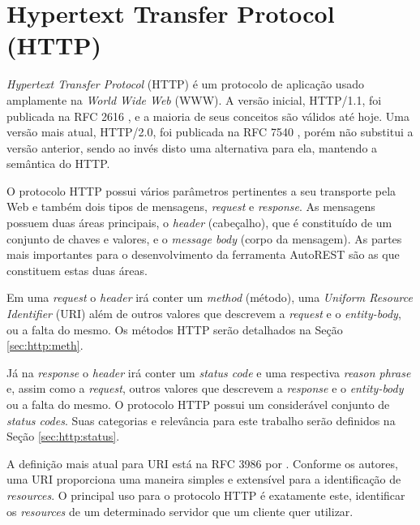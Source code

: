
\section{Hypertext Transfer Protocol (HTTP)}

\textit{Hypertext Transfer Protocol} (HTTP) é um protocolo de aplicação \cite{RFC1123} usado amplamente na \textit{World Wide Web} (WWW). A versão inicial, HTTP/1.1, foi publicada na RFC 2616 \cite{RFC2616}, e a maioria de seus conceitos são válidos até hoje. Uma versão mais atual, HTTP/2.0, foi publicada na RFC 7540 \cite{RFC7540}, porém não substitui a versão anterior, sendo ao invés disto uma alternativa para ela, mantendo a semântica do HTTP.

O protocolo HTTP possui vários parâmetros pertinentes a seu transporte pela Web e também dois tipos de mensagens, \textit{request} e \textit{response}. As mensagens possuem duas áreas principais, o \textit{header} (cabeçalho), que é constituído de um conjunto de chaves e valores, e o \textit{message body} (corpo da mensagem). As partes mais importantes para o desenvolvimento da ferramenta AutoREST são as que constituem estas duas áreas.

Em uma \textit{request} o \textit{header} irá conter um \textit{method} (método), uma \textit{Uniform Resource Identifier} (URI) além de outros valores que descrevem a \textit{request} e o \textit{entity-body}, ou a falta do mesmo. Os métodos HTTP serão detalhados na Seção \ref{sec:http:meth}.

Já na \textit{response} o \textit{header} irá conter um \textit{status code} e uma respectiva \textit{reason phrase} e, assim como a \textit{request}, outros valores que descrevem a \textit{response} e o \textit{entity-body} ou a falta do mesmo. O protocolo HTTP possui um considerável conjunto de \textit{status codes}. Suas categorias e relevância para este trabalho serão definidos na Seção \ref{sec:http:status}.

A definição mais atual para URI está na RFC 3986 por . Conforme os autores, uma URI proporciona uma maneira simples e extensível para a identificação de \textit{resources}. O principal uso para o protocolo HTTP é exatamente este, identificar os \textit{resources} de um determinado servidor que um cliente quer utilizar.

